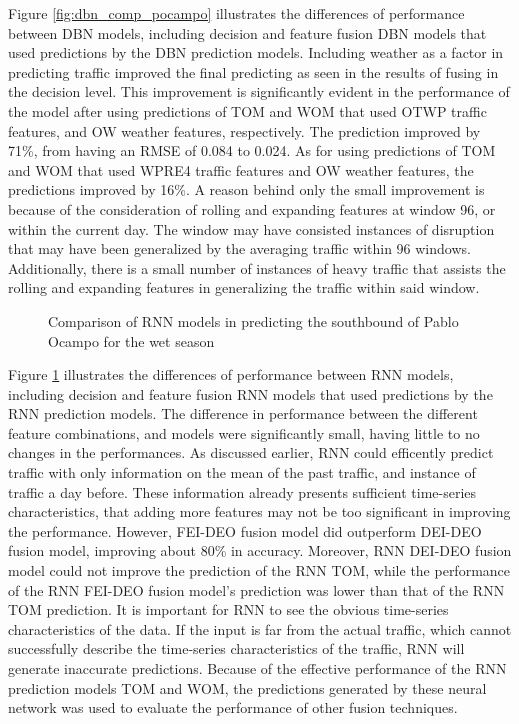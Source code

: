 Figure \ref{fig:dbn_comp_pocampo} illustrates the differences of performance between DBN models, including decision and feature fusion DBN models that used predictions by the DBN prediction models. Including weather as a factor in predicting traffic improved the final predicting as seen in the results of fusing in the decision level. This improvement is significantly evident in the performance of the model after using predictions of TOM and WOM that used OTWP traffic features, and OW weather features, respectively. The prediction improved by 71\%, from having an RMSE of 0.084 to 0.024. As for using predictions of TOM and WOM that used WPRE4 traffic features and OW weather features, the predictions improved by 16\%. A reason behind only the small improvement is because of the consideration of rolling and expanding features at window 96, or within the current day. The window may have consisted instances of disruption that may have been generalized by the averaging traffic within 96 windows. Additionally, there is a small number of instances of heavy traffic that assists the rolling and expanding features in generalizing the traffic within said window. 


\begin{figure}[h]
  \centering
  \captionsetup{justification=centering}
  \caption{Comparison of RNN models in predicting the southbound of Pablo Ocampo for the wet season}
  \label{fig:rnn_comp_pocampo}
\end{figure}

Figure \ref{fig:rnn_comp_pocampo} illustrates the differences of performance between RNN models, including decision and feature fusion RNN models that used predictions by the RNN prediction models. The difference in performance between the different feature combinations, and models were significantly small, having little to no changes in the performances. As discussed earlier, RNN could efficently predict traffic with only information on the mean of the past traffic, and instance of traffic a day before. These information already presents sufficient time-series characteristics, that adding more features may not be too significant in improving the performance. However, FEI-DEO fusion model did outperform DEI-DEO fusion model, improving about 80\% in accuracy. Moreover, RNN DEI-DEO fusion model could not improve the prediction of the RNN TOM, while the performance of the RNN FEI-DEO fusion model's prediction was lower than that of the RNN TOM prediction. It is important for RNN to see the obvious time-series characteristics of the data. If the input is far from the actual traffic, which cannot successfully describe the time-series characteristics of the traffic, RNN will generate inaccurate predictions. Because of the effective performance of the RNN prediction models TOM and WOM, the predictions generated by these neural network was used to evaluate the performance of other fusion techniques. 

